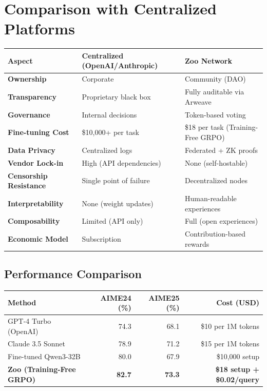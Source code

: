 \section{Comparison with Centralized Platforms}


\begin{center}
\small
\begin{tabular}{lp{3cm}p{3cm}}
\toprule
\textbf{Aspect} & \textbf{Centralized (OpenAI/Anthropic)} & \textbf{Zoo Network} \\
\midrule
\textbf{Ownership} & Corporate & Community (DAO) \\
\textbf{Transparency} & Proprietary black box & Fully auditable via Arweave \\
\textbf{Governance} & Internal decisions & Token-based voting \\
\textbf{Fine-tuning Cost} & \$10,000+ per task & \$18 per task (Training-Free GRPO) \\
\textbf{Data Privacy} & Centralized logs & Federated + ZK proofs \\
\textbf{Vendor Lock-in} & High (API dependencies) & None (self-hostable) \\
\textbf{Censorship Resistance} & Single point of failure & Decentralized nodes \\
\textbf{Interpretability} & None (weight updates) & Human-readable experiences \\
\textbf{Composability} & Limited (API only) & Full (open experiences) \\
\textbf{Economic Model} & Subscription & Contribution-based rewards \\
\bottomrule
\end{tabular}
\end{center}

\subsection{Performance Comparison}

\begin{center}
\begin{tabular}{lrrr}
\toprule
\textbf{Method} & \textbf{AIME24 (\%)} & \textbf{AIME25 (\%)} & \textbf{Cost (USD)} \\
\midrule
GPT-4 Turbo (OpenAI) & 74.3 & 68.1 & \$10 per 1M tokens \\
Claude 3.5 Sonnet & 78.9 & 71.2 & \$15 per 1M tokens \\
Fine-tuned Qwen3-32B & 80.0 & 67.9 & \$10,000 setup \\
\textbf{Zoo (Training-Free GRPO)} & \textbf{82.7} & \textbf{73.3} & \textbf{\$18 setup + \$0.02/query} \\
\bottomrule
\end{tabular}
\end{center}

